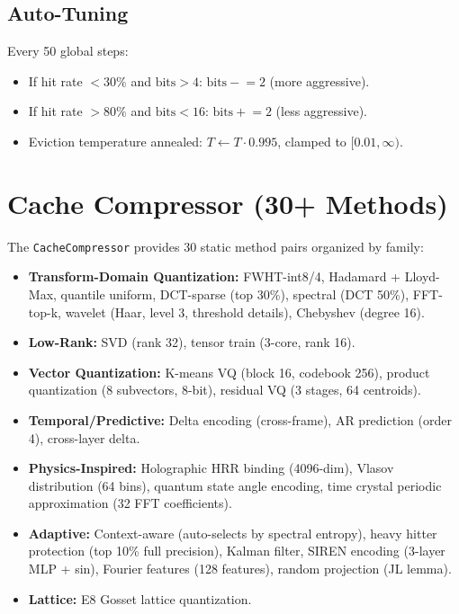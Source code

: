 \documentclass[11pt,a4paper,openright]{book}
\begin{document}
\subsection{Auto-Tuning}

Every 50 global steps:
\begin{itemize}
	\item If hit rate $<30\%$ and $\text{bits} > 4$: $\text{bits} \mathrel{-}= 2$ (more aggressive).
	\item If hit rate $>80\%$ and $\text{bits} < 16$: $\text{bits} \mathrel{+}= 2$ (less aggressive).
	\item Eviction temperature annealed: $T \gets T \cdot 0.995$, clamped to $[0.01, \infty)$.
\end{itemize}

\section{Cache Compressor (30+ Methods)}

The \texttt{CacheCompressor} provides 30 static method pairs organized by family:

\begin{itemize}
	\item \textbf{Transform-Domain Quantization:} FWHT-int8/4, Hadamard + Lloyd-Max, quantile uniform, DCT-sparse (top 30\%), spectral (DCT 50\%), FFT-top-k, wavelet (Haar, level 3, threshold details), Chebyshev (degree 16).
	\item \textbf{Low-Rank:} SVD (rank 32), tensor train (3-core, rank 16).
	\item \textbf{Vector Quantization:} K-means VQ (block 16, codebook 256), product quantization (8 subvectors, 8-bit), residual VQ (3 stages, 64 centroids).
	\item \textbf{Temporal/Predictive:} Delta encoding (cross-frame), AR prediction (order 4), cross-layer delta.
	\item \textbf{Physics-Inspired:} Holographic HRR binding (4096-dim), Vlasov distribution (64 bins), quantum state angle encoding, time crystal periodic approximation (32 FFT coefficients).
	\item \textbf{Adaptive:} Context-aware (auto-selects by spectral entropy), heavy hitter protection (top 10\% full precision), Kalman filter, SIREN encoding (3-layer MLP + sin), Fourier features (128 features), random projection (JL lemma).
	\item \textbf{Lattice:} E8 Gosset lattice quantization.
\end{itemize}
\end{document}
